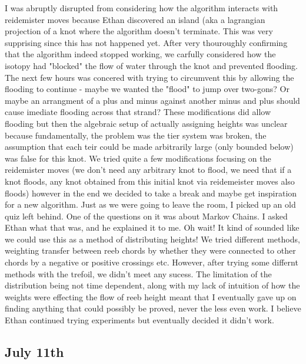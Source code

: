 \documentclass[11pt,oneside]{amsart}
\begin{document}
I was abruptly disrupted from considering how the algorithm interacts with reidemister moves because Ethan discovered an island (aka a lagrangian projection of a knot where the algorithm doesn't terminate. This was very supprising since this has not happened yet. After very thouroughly confirming that the algorithm indeed stopped working, we carfully considered how the isotopy had "blocked" the flow of water through the knot and prevented flooding. The next few hours was concered with trying to circumvent this by allowing the flooding to continue - maybe we wanted the "flood" to jump over two-gons? Or maybe an arrangment of a plus and minus against another minus and plus should cause imediate flooding across that strand? These modifications did allow flooding but then the algebraic setup of actually assigning heights was unclear because fundamentally, the problem was the tier system was broken, the assumption that each teir could be made arbitrarily large (only bounded below) was false for this knot. We tried quite a few modifications focusing on the reidemister moves (we don't need any arbitrary knot to flood, we need that if a knot floods, any knot obtained from this initial knot via reidemeister moves also floods) however in the end we decided to take a break and maybe get inspiration for a new algorithm. Just as we were going to leave the room, I picked up an old quiz left behind. One of the questions on it was about Markov Chains. I asked Ethan what that was, and he explained it to me. Oh wait! It kind of sounded like we could use this as a method of distributing heights! We tried different methods, weighting transfer between reeb chords by whether they were connected to other chords by a negative or positive crossings etc. However, after trying some differnt methods with the trefoil, we didn't meet any sucess. The limitation of the distribution being not time dependent, along with my lack of intuition of how the weights were effecting the flow of reeb height meant that I eventually gave up on finding anything that could possibly be proved, never the less even work. I believe Ethan continued trying experiments but eventually decided it didn't work.



\subsection{July 11th}
\end{document}
